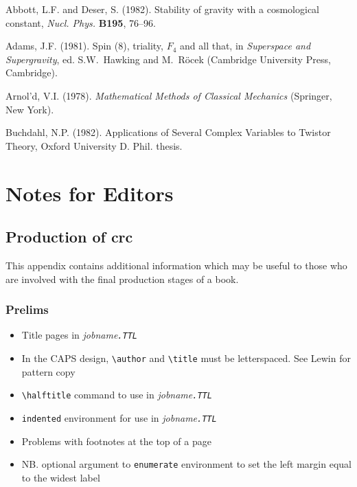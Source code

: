 \documentclass[cup6a]{cupbook}
\begin{document}
\begin{thereferences}{99}
 \label{reflist}
  Abbott, L.F. and Deser, S. (1982). Stability of gravity with a
  cosmological constant, \textit{Nucl. Phys.} \textbf{B195}, 76--96.

  Adams, J.F. (1981). Spin (8), triality, $F_4$ and all that, in
  \textit{Superspace and Supergravity}, ed. S.W.~Hawking and M.~R\"ocek
  (Cambridge University Press, Cambridge).

  Arnol'd, V.I. (1978). \textit{Mathematical Methods of Classical
  Mechanics} (Springer, New York).

  Buchdahl, N.P. (1982). Applications of Several Complex Variables to
  Twistor Theory, Oxford University D. Phil. thesis.
\end{thereferences}

\cleardoublepage
\appendix
\chapter{Notes for Editors}

\section{Production of crc}

This appendix contains additional information which may be useful to
those who are involved with the final production stages of a book.

\subsection{Prelims}
 \begin{itemize}\listsize
  \item Title pages in \textit{jobname\tt.TTL}
  \item In the CAPS design, \verb"\author" and \verb"\title" must be 
        letterspaced. See Lewin for pattern copy
  \item \verb"\halftitle" command to use in \textit{jobname\tt.TTL}
  \item \texttt{indented} environment for use in \textit{jobname\tt.TTL}
  \item Problems with footnotes at the top of a page
  \item NB. optional argument to \texttt{enumerate} environment to set the
        left margin equal to the widest label
\end{itemize}
\end{document}
